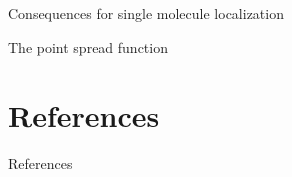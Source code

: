 \documentclass[aspectratio=1610]{beamer}					%
\begin{document}
\begin{frame}{Consequences for single molecule localization}

The point spread function

\end{frame}

\section{References}

\begin{frame}[allowframebreaks]{References}
	\tiny
	
\end{frame}
\end{document}
